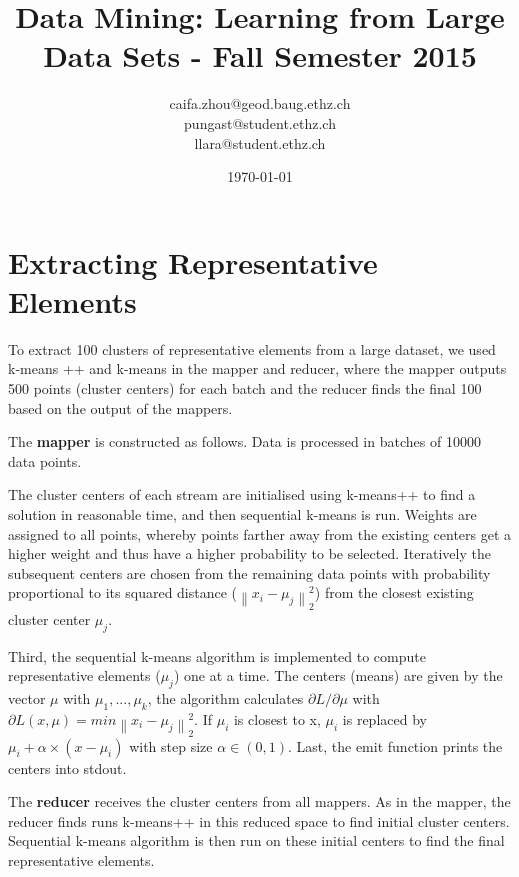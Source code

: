 \documentclass[a4paper, 11pt]{article}
\title{Data Mining: Learning from Large Data Sets - Fall Semester 2015}
\author{caifa.zhou@geod.baug.ethz.ch\\ pungast@student.ethz.ch\\ llara@student.ethz.ch\\}
\date{\today}
\begin{document}
\maketitle

\section*{Extracting Representative Elements} 

To extract 100 clusters of representative elements from a large dataset, we used k-means ++ and k-means in the mapper and reducer, where the mapper outputs 500 points (cluster centers) for each batch and the reducer finds the final 100 based on the output of the mappers.

The \textbf{mapper} is constructed as follows. Data is processed in batches of 10000 data points.

The cluster centers of each stream are initialised using k-means++ to find a solution in reasonable time, and then sequential k-means is run. Weights are assigned to all points, whereby points farther away from the existing centers get a higher weight and thus have a higher probability to be selected. Iteratively the subsequent centers are chosen from the remaining data points with probability proportional to its squared distance ($\left \| x_{i} - \mu_{j} \right \|^{2}_{2}$) from the closest existing cluster center $\mu_{j}$.

Third, the sequential k-means algorithm is implemented to compute representative elements ($\mu_{j}$) one at a time. The centers (means) are given by the vector $\mu$ with $\mu_{1},...,\mu_{k}$, the algorithm calculates $\partial L/\partial \mu$ with $ \partial L(x,\mu) = min \left \| x_{i} - \mu_{j} \right \|^{2}_{2}$. If $\mu_{i}$ is closest to x,  $\mu_{i}$ is replaced by $\mu_{i}  + \alpha \times (x - \mu_{i})$ with step size  $\alpha \in (0,1)$. 
Last, the emit function prints the centers into stdout.

The \textbf{reducer} receives the cluster centers from all mappers. As in the mapper, the reducer finds runs k-means++ in this reduced space to find initial cluster centers. Sequential k-means algorithm is then run on these initial centers to find the final representative elements. \\ 
\end{document}
